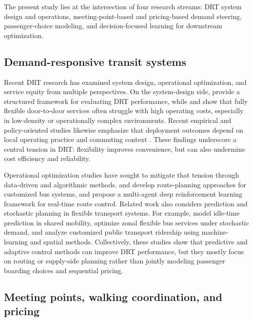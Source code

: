 \documentclass[preprint,12pt,authoryear]{elsarticle}
\begin{document}
The present study lies at the intersection of four research streams: DRT system design and operations, meeting-point-based and pricing-based demand steering, passenger-choice modeling, and decision-focused learning for downstream optimization.

\subsection{Demand-responsive transit systems}

Recent DRT research has examined system design, operational optimization, and service equity from multiple perspectives. On the system-design side, \citet{baier2024} provide a structured framework for evaluating DRT performance, while \citet{sorensen2021} and \citet{currie2020} show that fully flexible door-to-door services often struggle with high operating costs, especially in low-density or operationally complex environments. Recent empirical and policy-oriented studies likewise emphasize that deployment outcomes depend on local operating practice and commuting context \citep{ghimire2024,gerzinic2025}. These findings underscore a central tension in DRT: flexibility improves convenience, but can also undermine cost efficiency and reliability.

Operational optimization studies have sought to mitigate that tension through data-driven and algorithmic methods. \citet{lyu2019} and \citet{xia2022} develop route-planning approaches for customized bus systems, and \citet{wu2024} propose a multi-agent deep reinforcement learning framework for real-time route control. Related work also considers prediction and stochastic planning in flexible transport systems. For example, \citet{kostic2021} model idle-time prediction in shared mobility, \citet{lee2021} optimize zonal flexible bus services under stochastic demand, and \citet{liu2023} analyze customized public transport ridership using machine-learning and spatial methods. Collectively, these studies show that predictive and adaptive control methods can improve DRT performance, but they mostly focus on routing or supply-side planning rather than jointly modeling passenger boarding choices and sequential pricing.

\subsection{Meeting points, walking coordination, and pricing}
\end{document}
